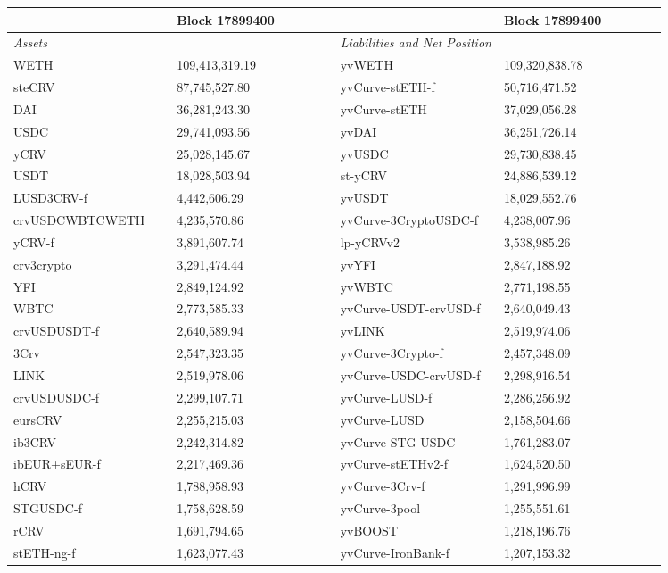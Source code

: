 
\begin{longtable}{@{}p{0.25\linewidth}p{0.25\linewidth}p{0.25\linewidth}p{0.25\linewidth}@{}}

\toprule


& Block 17899400 & & Block 17899400 \\

\midrule
\textit{Assets} & & \textit{Liabilities and Net Position} \\
WETH & 109,413,319.19 & yvWETH & 109,320,838.78 \\
steCRV & 87,745,527.80 & yvCurve-stETH-f & 50,716,471.52 \\
DAI & 36,281,243.30 & yvCurve-stETH & 37,029,056.28 \\
USDC & 29,741,093.56 & yvDAI & 36,251,726.14 \\
yCRV & 25,028,145.67 & yvUSDC & 29,730,838.45 \\
USDT & 18,028,503.94 & st-yCRV & 24,886,539.12 \\
LUSD3CRV-f & 4,442,606.29 & yvUSDT & 18,029,552.76 \\
crvUSDCWBTCWETH & 4,235,570.86 & yvCurve-3CryptoUSDC-f & 4,238,007.96 \\
yCRV-f & 3,891,607.74 & lp-yCRVv2 & 3,538,985.26 \\
crv3crypto & 3,291,474.44 & yvYFI & 2,847,188.92 \\
YFI & 2,849,124.92 & yvWBTC & 2,771,198.55 \\
WBTC & 2,773,585.33 & yvCurve-USDT-crvUSD-f & 2,640,049.43 \\
crvUSDUSDT-f & 2,640,589.94 & yvLINK & 2,519,974.06 \\
3Crv & 2,547,323.35 & yvCurve-3Crypto-f & 2,457,348.09 \\
LINK & 2,519,978.06 & yvCurve-USDC-crvUSD-f & 2,298,916.54 \\
crvUSDUSDC-f & 2,299,107.71 & yvCurve-LUSD-f & 2,286,256.92 \\
eursCRV & 2,255,215.03 & yvCurve-LUSD & 2,158,504.66 \\
ib3CRV & 2,242,314.82 & yvCurve-STG-USDC & 1,761,283.07 \\
ibEUR+sEUR-f & 2,217,469.36 & yvCurve-stETHv2-f & 1,624,520.50 \\
hCRV & 1,788,958.93 & yvCurve-3Crv-f & 1,291,996.99 \\
STGUSDC-f & 1,758,628.59 & yvCurve-3pool & 1,255,551.61 \\
rCRV & 1,691,794.65 & yvBOOST & 1,218,196.76 \\
stETH-ng-f & 1,623,077.43 & yvCurve-IronBank-f & 1,207,153.32 \\

\end{longtable}
